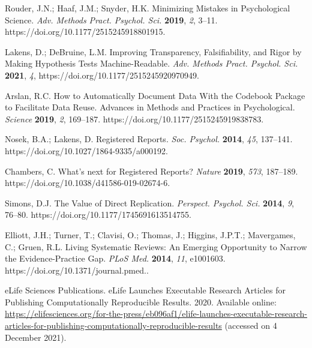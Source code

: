 \documentclass[psych,tutorial,accept,moreauthors,pdftex]{Definitions/mdpi}
\begin{document}
\begin{thebibliography}{999}
Rouder, J.N.; Haaf, J.M.; Snyder, H.K. Minimizing Mistakes in Psychological Science. \emph{Adv. Methods Pract. Psychol. Sci.} \textbf{2019}, \emph{2}, 3--11. https://doi.org/10.1177/2515245918801915.


Lakens, D.; DeBruine, L.M. Improving Transparency, Falsifiability, and Rigor by Making Hypothesis Tests Machine-Readable. \emph{Adv. Methods Pract. Psychol. Sci.} \textbf{2021}, \emph{4}, https://doi.org/10.1177/2515245920970949.


Arslan, R.C. How to Automatically Document Data With the Codebook Package to Facilitate Data Reuse. Advances in Methods and Practices in Psychological. \emph{Science} \textbf{2019}, \emph{2}, 169--187. https://doi.org/10.1177/2515245919838783.


Nosek, B.A.; Lakens, D. Registered Reports. \emph{Soc. Psychol.} \textbf{2014}, \emph{45}, 137--141. https://doi.org/10.1027/1864-9335/a000192.


Chambers, C. What’s next for Registered Reports? \emph{Nature} \textbf{2019}, \emph{573}, 187--189. https://doi.org/10.1038/d41586-019-02674-6.

Simons, D.J. The Value of Direct Replication. \emph{Perspect. Psychol. Sci.} \textbf{2014}, \emph{9}, 76--80. https://doi.org/10.1177/1745691613514755.

Elliott, J.H.; Turner, T.; Clavisi, O.; Thomas, J.; Higgins, J.P.T.; Mavergames, C.; Gruen, R.L. Living Systematic Reviews: An Emerging Opportunity to Narrow the Evidence-Practice Gap. \emph{PLoS Med.} \textbf{2014}, \emph{11}, e1001603. https://doi.org/10.1371/journal.pmed..

eLife Sciences Publications. eLife Launches Executable Research Articles for Publishing Computationally Reproducible Results. {2020.} Available online: \url{https://elifesciences.org/for-the-press/eb096af1/elife-launches-executable-research-articles-for-publishing-computationally-reproducible-results}  (accessed on 4 December 2021). %



\end{thebibliography}
\end{document}

